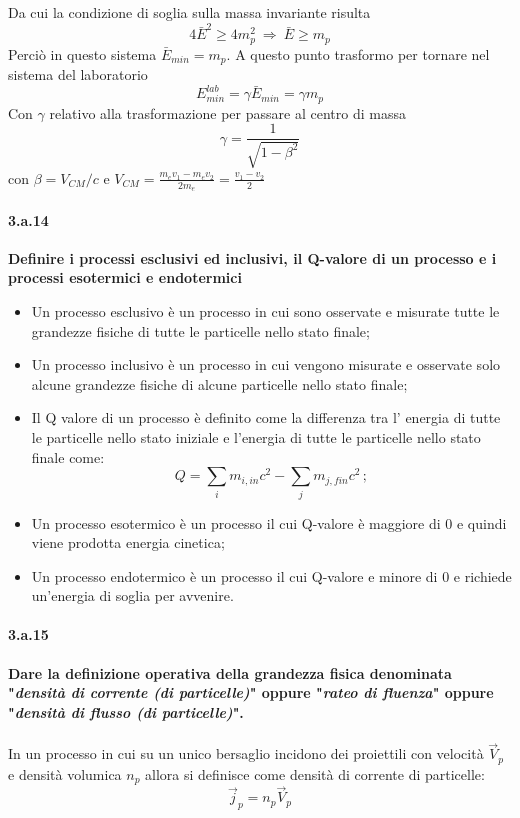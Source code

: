 \documentclass[twoside]{article}
\begin{document}
Da cui la condizione di soglia sulla massa invariante risulta
\begin{equation}
    4\bar{E}^2\ge 4m_p^2 \ \Rightarrow \ \bar{E}\ge m_p
\end{equation}
Perciò in questo sistema $\bar{E}_{min}=m_p$. A questo punto trasformo per tornare nel sistema del laboratorio
\begin{equation}
    E_{min}^{lab}=\gamma \bar{E}_{min}=\gamma m_p
\end{equation}
Con $\gamma$ relativo alla trasformazione per passare al centro di massa
\begin{equation}
    \gamma=\frac{1}{\sqrt{1-\beta^2}}
\end{equation}
con $\beta=V_{CM}/c$ e $V_{CM}=\frac{m_e v_1-m_e v_2}{2m_e}=\frac{v_1-v_2}{2}$



\paragraph{3.a.14}\textbf{Definire i processi esclusivi ed inclusivi, il Q-valore di un processo e i processi esotermici e endotermici}
\begin{itemize}
    \item Un processo esclusivo è un processo in cui sono osservate e misurate tutte le grandezze fisiche di tutte le particelle nello stato finale;
    \item Un processo inclusivo è un processo in cui vengono misurate e osservate solo alcune grandezze fisiche di alcune particelle nello stato finale;
    \item Il Q valore di un processo è definito come la differenza tra l' energia di tutte le particelle nello stato iniziale e l'energia di tutte le particelle nello stato finale come:
    \begin{equation}
        Q=\sum_i m_{i,in}c^2-\sum_jm_{j,fin}c^2\,;
    \end{equation}
    \item Un processo esotermico è un processo il cui Q-valore è maggiore di $0$ e quindi viene prodotta energia cinetica;
    \item Un processo endotermico è un processo il cui Q-valore e minore di $0$ e richiede un'energia di soglia per avvenire.
\end{itemize}


\paragraph{3.a.15}\textbf{Dare la definizione operativa della grandezza fisica denominata "\textbf{\textit{densità di corrente (di particelle)}}" oppure "\textbf{\textit{rateo di fluenza}}" oppure "\textbf{\textit{densità di flusso (di particelle)}}".}\\
\\
In un processo in cui su un unico bersaglio incidono dei proiettili con velocità $\vec{V}_p$ e densità volumica $n_p$ allora si definisce come densità di corrente di particelle:
\begin{equation}
    \vec{j}_p=n_p\vec{V}_p
\end{equation}
\end{document}

